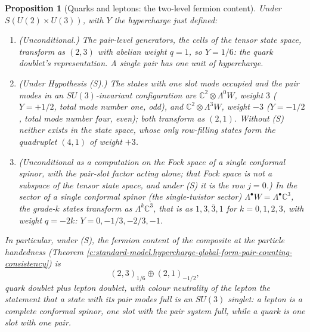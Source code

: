 \documentclass[11pt]{article}
\newtheorem{proposition}[theorem]{Proposition}
\theoremstyle{definition}
\theoremstyle{plain}
\newcommand{\changedmark}[2]{\marginpar{\raggedright\scriptsize\color{#1}#2}}
\providecommand{\C}{}\renewcommand{\C}{\mathbb{C}}
\begin{document}
\begin{proposition}[Quarks and leptons: the two-level fermion content]\label{c:standard-model.quarks-leptons-two-level-fermion-content}
\changedmark{gray}{reworded}
Under $S(U(2) \times U(3))$, with $Y$ the hypercharge just defined:
\begin{enumerate}
\item (Unconditional.) The pair-level generators, the cells of the tensor state space, transform as $(2, 3)$ with abelian weight $q = 1$, so $Y = 1/6$: the quark doublet's representation. A single pair has one unit of hypercharge.
\item (Under Hypothesis (S).) The states with one slot mode occupied and the pair modes in an $SU(3)$-invariant configuration are $\C^{2} \otimes \Lambda^{0}W$, weight $3$ ($Y = +1/2$, total mode number one, odd), and $\C^{2} \otimes \Lambda^{3}W$, weight $-3$ ($Y = -1/2$, total mode number four, even); both transform as $(2, 1)$. Without (S) neither exists in the state space, whose only row-filling states form the quadruplet $(4,1)$ of weight $+3$.
\item (Unconditional as a computation on the Fock space of a single conformal spinor, with the pair-slot factor acting alone; that Fock space is not a subspace of the tensor state space, and under (S) it is the row $j = 0$.) In the sector of a single conformal spinor (the single-twistor sector) $\Lambda^{\bullet}W = \Lambda^{\bullet}\C^{3}$, the grade-$k$ states transform as $\Lambda^{k}\C^{3}$, that is as $1, 3, \bar{3}, 1$ for $k = 0, 1, 2, 3$, with weight $q = -2k$: $Y = 0, -1/3, -2/3, -1$.
\end{enumerate}
In particular, under (S), the fermion content of the composite at the particle handedness (Theorem \ref{c:standard-model.hypercharge-global-form-pair-counting-consistency}) is
\begin{equation}
(2,3)_{1/6} \oplus (2,1)_{-1/2},
\end{equation}
quark doublet plus lepton doublet, with colour neutrality of the lepton the statement that a state with its pair modes full is an $SU(3)$ singlet: a lepton is a complete conformal spinor, one slot with the pair system full, while a quark is one slot with one pair.
\end{proposition}
\end{document}
